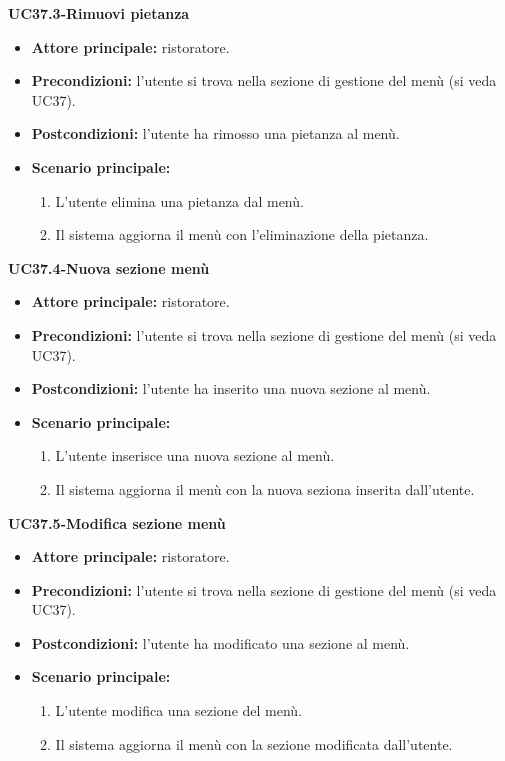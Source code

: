 \textbf{UC37.3-Rimuovi pietanza}  
\begin{itemize}
    \item \textbf{Attore principale:} ristoratore.
    \item \textbf{Precondizioni:} l'utente si trova nella sezione di gestione del menù (si veda UC37).
    \item \textbf{Postcondizioni:} l'utente ha rimosso una pietanza al menù.
    \item \textbf{Scenario principale:}
    \begin{enumerate}
        \item L'utente elimina una pietanza dal menù.
        \item Il sistema aggiorna il menù con l'eliminazione della pietanza.
    \end{enumerate}
\end{itemize}


\textbf{UC37.4-Nuova sezione menù}  
\begin{itemize}
    \item \textbf{Attore principale:} ristoratore.
    \item \textbf{Precondizioni:} l'utente si trova nella sezione di gestione del menù (si veda UC37).
    \item \textbf{Postcondizioni:} l'utente ha inserito una nuova sezione al menù.
    \item \textbf{Scenario principale:}
    \begin{enumerate}
        \item L'utente inserisce una nuova sezione al menù.
        \item Il sistema aggiorna il menù con la nuova seziona inserita dall'utente.
    \end{enumerate}
\end{itemize}

\textbf{UC37.5-Modifica sezione menù}  
\begin{itemize}
    \item \textbf{Attore principale:} ristoratore.
    \item \textbf{Precondizioni:} l'utente si trova nella sezione di gestione del menù (si veda UC37).
    \item \textbf{Postcondizioni:} l'utente ha modificato una sezione al menù.
    \item \textbf{Scenario principale:}
    \begin{enumerate}
        \item L'utente modifica una sezione del menù.
        \item Il sistema aggiorna il menù con la sezione modificata dall'utente.
    \end{enumerate}
\end{itemize}

